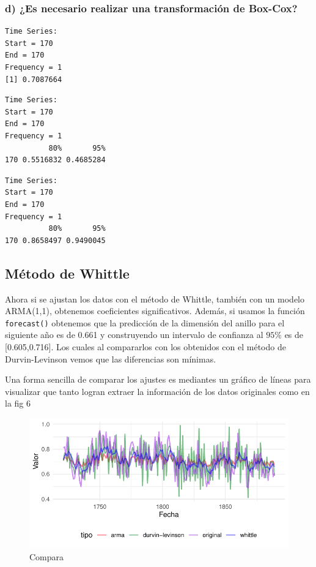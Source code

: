 \documentclass[
  letterpaper,
  DIV=11,
  numbers=noendperiod,
  twocolumn]{scrartcl}
\begin{document}
\hypertarget{d-es-necesario-realizar-una-transformaciuxf3n-de-box-cox}{%
\subsubsection{d) ¿Es necesario realizar una transformación de
Box-Cox?}\label{d-es-necesario-realizar-una-transformaciuxf3n-de-box-cox}}

\begin{verbatim}
Time Series:
Start = 170 
End = 170 
Frequency = 1 
[1] 0.7087664
\end{verbatim}

\begin{verbatim}
Time Series:
Start = 170 
End = 170 
Frequency = 1 
          80%       95%
170 0.5516832 0.4685284
\end{verbatim}

\begin{verbatim}
Time Series:
Start = 170 
End = 170 
Frequency = 1 
          80%       95%
170 0.8658497 0.9490045
\end{verbatim}

\hypertarget{muxe9todo-de-whittle}{%
\subsection{Método de Whittle}\label{muxe9todo-de-whittle}}

Ahora si se ajustan los datos con el método de Whittle, también con un
modelo ARMA(1,1), obtenemos coeficientes significativos. Además, si
usamos la función \texttt{forecast()} obtenemos que la predicción de la
dimensión del anillo para el siguiente año es de 0.661 y construyendo un
intervalo de confianza al \(95\%\) es de {[}0.605,0.716{]}. Los cuales
al compararlos con los obtenidos con el método de Durvin-Levinson vemos
que las diferencias son mínimas.

Una forma sencilla de comparar los ajustes es mediantes un gráfico de
líneas para visualizar que tanto logran extraer la información de los
datos originales como en la fig 6

\begin{figure}[H]

{\centering \includegraphics{CopyOfpdf_tarea2_files/figure-pdf/fig-exp6-1.pdf}

}

\caption{\label{fig-exp6}Compara}

\end{figure}
\end{document}
